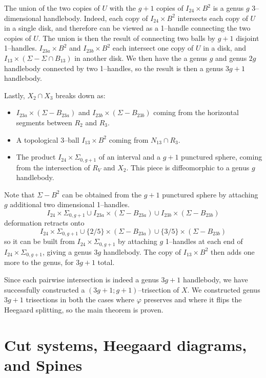 \documentclass[12pt]{amsart}
\theoremstyle{definition}
\theoremstyle{remark}
\begin{document}
The union of the two copies of $U$ with the $g+1$ copies of $I_{24} \times B^2$ is a genus $g$ 3--dimensional handlebody.  Indeed, each copy of $I_{24} \times B^2$ intersects each copy of $U$ in a single disk, and therefore can be viewed as a 1--handle connecting the two copies of $U$.  The union is then the result of connecting two balls by $g+1$ disjoint 1--handles.  $I_{23a} \times B^2$ and $I_{23b} \times B^2$ each intersect one copy of $U$ in a disk, and $I_{13} \times (\Sigma - \Sigma \cap B_{13})$ in another disk.   We then have the a genus $g$ and genus $2g$ handlebody connected by two 1--handles, so the result is then a genus $3g+1$ handlebody.

Lastly, $X_2 \cap X_3$ breaks down as:
\begin{itemize}
\item $I_{23a} \times (\Sigma - B_{23a})$ and $I_{23b} \times (\Sigma - B_{23b})$ coming from the horizontal segments between $R_2$ and $R_3$.
\item A topological 3--ball $I_{13} \times B^2$ coming from $N_{13} \cap R_3$.
\item The product $I_{24} \times \Sigma_{0,g+1}$ of an interval and a $g+1$ punctured sphere, coming from the intersection of $R_V$ and $X_2$.  This piece is diffeomorphic to a genus $g$ handlebody.
\end{itemize}

Note that $\Sigma - B^2$ can be obtained from the $g+1$ punctured sphere by attaching $g$ additional two dimensional 1--handles.  $$I_{24} \times \Sigma_{0,g+1} \cup I_{23a} \times (\Sigma - B_{23a}) \cup I_{23b} \times (\Sigma - B_{23b})$$ deformation retracts onto $$I_{24} \times \Sigma_{0,g+1} \cup  \{2/5\} \times (\Sigma - B_{23a}) \cup  \{3/5\} \times (\Sigma - B_{23b}) $$ so it can be built from $I_{24} \times \Sigma_{0,g+1}$ by attaching $g$ 1--handles at each end of $I_{24} \times \Sigma_{0,g+1}$, giving a genus $3g$ handlebody.  The copy of $I_{13} \times B^2$ then adds one more to the genus, for $3g+1$ total.


Since each pairwise intersection is indeed a genus $3g+1$ handlebody, we have successfully constructed a $(3g+1;g+1)$--trisection of $X$.  We constructed genus $3g+1$ trisections in both the cases where $\varphi$ preserves and where it flips the Heegaard splitting, so the main theorem is proven.

\section{Cut systems, Heegaard diagrams, and Spines}
\label{sec_cutsystems}
\end{document}
